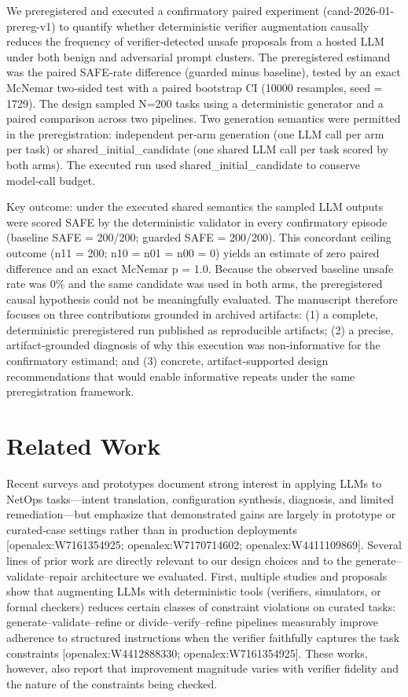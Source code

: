 \documentclass[conference]{IEEEtran}
\begin{document}
We preregistered and executed a confirmatory paired experiment (cand-2026-01-prereg-v1) to quantify whether deterministic verifier augmentation causally reduces the frequency of verifier‑detected unsafe proposals from a hosted LLM under both benign and adversarial prompt clusters. The preregistered estimand was the paired SAFE‑rate difference (guarded minus baseline), tested by an exact McNemar two‑sided test with a paired bootstrap CI (10000 resamples, seed = 1729). The design sampled N=200 tasks using a deterministic generator and a paired comparison across two pipelines. Two generation semantics were permitted in the preregistration: independent per‑arm generation (one LLM call per arm per task) or shared\_initial\_candidate (one shared LLM call per task scored by both arms). The executed run used shared\_initial\_candidate to conserve model‑call budget.

Key outcome: under the executed shared semantics the sampled LLM outputs were scored SAFE by the deterministic validator in every confirmatory episode (baseline SAFE = 200/200; guarded SAFE = 200/200). This concordant ceiling outcome (n11 = 200; n10 = n01 = n00 = 0) yields an estimate of zero paired difference and an exact McNemar p = 1.0. Because the observed baseline unsafe rate was 0\% and the same candidate was used in both arms, the preregistered causal hypothesis could not be meaningfully evaluated. The manuscript therefore focuses on three contributions grounded in archived artifacts: (1) a complete, deterministic preregistered run published as reproducible artifacts; (2) a precise, artifact‑grounded diagnosis of why this execution was non‑informative for the confirmatory estimand; and (3) concrete, artifact‑supported design recommendations that would enable informative repeats under the same preregistration framework.

\section{Related Work}
Recent surveys and prototypes document strong interest in applying LLMs to NetOps tasks---intent translation, configuration synthesis, diagnosis, and limited remediation---but emphasize that demonstrated gains are largely in prototype or curated‑case settings rather than in production deployments [openalex:W7161354925; openalex:W7170714602; openalex:W4411109869]. Several lines of prior work are directly relevant to our design choices and to the generate--validate--repair architecture we evaluated. First, multiple studies and proposals show that augmenting LLMs with deterministic tools (verifiers, simulators, or formal checkers) reduces certain classes of constraint violations on curated tasks: generate--validate--refine or divide--verify--refine pipelines measurably improve adherence to structured instructions when the verifier faithfully captures the task constraints [openalex:W4412888330; openalex:W7161354925]. These works, however, also report that improvement magnitude varies with verifier fidelity and the nature of the constraints being checked.
\end{document}
